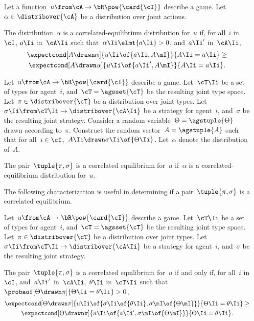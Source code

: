\begin{definition}
Let a function~\(u \from \cA \to \bR \pow{\card{\cI}}\) describe a game.
Let~\(\alpha \in \distribover{\cA}\) be a distribution over joint actions.

The distribution~\(\alpha\) is a correlated-equilibrium distribution for~\(u\) if, for all~\(i\) in~\(\cI\),  \(a\Ii\) in~\(\cA\Ii\) such that~\(\alpha\Ii \elmt{a\Ii} > 0\), and~\(a\Ii'\) in~\(\cA\Ii\),
\begin{multline*}
\expectcond[A \drawn \alpha]{u\Ii \of{a\Ii, A\mI}}{A\Ii = a\Ii}
\ge\\
\expectcond[A\drawn\alpha]{u\Ii \of{a\Ii', A\mI}}{A\Ii = a\Ii}
.
\end{multline*}
\end{definition}

\begin{definition}
Let~\(u \from \cA \to \bR \pow{\card{\cI}}\) describe a game.
Let~\(\cT\Ii\) be a set of types for agent~\(i\), and~\(\cT = \agsset{\cT}\) be the resulting joint type space.
Let~\(\pi \in \distribover{\cT}\) be a distribution over joint types.
Let~\(\sigma\Ii \from \cT\Ii \to \distribover{\cA\Ii}\) be a strategy for agent~\(i\), and~\(\sigma\) be the resulting joint strategy.
Consider a random variable~\(\Theta = \agstuple{\Theta}\) drawn according to~\(\pi\).
Construct the random vector~\(A = \agstuple{A}\) such that for all~\(i \in \cI\),~\(A\Ii \drawn \sigma\Ii \of{\Theta\Ii}\).
Let~\(\alpha\) denote the distribution of~\(A\).

The pair~\(\tuple{\pi, \sigma}\) is a correlated equilibrium for~\(u\) if~\(\alpha\) is a correlated-equilibrium distribution for~\(u\).
\end{definition}

The following characterization is useful in determining if a pair~\(\tuple{\pi, \sigma}\) is a correlated equilibrium.

\begin{proposition}[Characterization]
\label{res:characterization_CE}
Let~\(u \from \cA \to \bR \pow{\card{\cI}}\) describe a game.
Let~\(\cT\Ii\) be a set of types for agent~\(i\), and~\(\cT = \agsset{\cT}\) be the resulting joint type space.
Let~\(\pi \in \distribover{\cT}\) be a distribution over joint types.
Let~\(\sigma\Ii \from \cT\Ii \to \distribover{\cA\Ii}\) be a strategy for agent~\(i\), and~\(\sigma\) be the resulting joint strategy.

The pair~\(\tuple{\pi, \sigma}\) is a correlated equilibrium for~\(u\) if and only if, for all~\(i\) in \(\cI\), and~\(a\Ii'\) in~\(\cA\Ii\), \(\theta\Ii\) in~\(\cT\Ii\) such that~\(\probaof[\Theta \drawn \pi]{\Theta\Ii = \theta\Ii} > 0\),
\begin{multline*}
\expectcond[\Theta \drawn \pi]{u\Ii \of{\sigma\Ii \of{\theta\Ii}, \sigma\mI \of{\Theta\mI}}}{\Theta\Ii = \theta\Ii}
\ge \\
\expectcond[\Theta \drawn \pi]{u\Ii \of{a\Ii', \sigma\mI \of{\Theta\mI}}}{\Theta\Ii = \theta\Ii}
.
\end{multline*}

\end{proposition}

